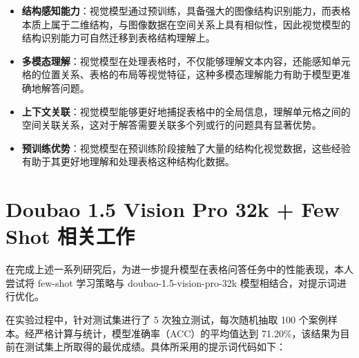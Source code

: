 \documentclass[12pt,a4paper]{ctexart}
\begin{document}
\begin{itemize}
  \item \textbf{结构感知能力}：视觉模型通过预训练，具备强大的图像结构识别能力，而表格本质上属于二维结构，与图像数据在空间关系上具有相似性，因此视觉模型的结构识别能力可自然迁移到表格结构理解上。
  \item \textbf{多模态理解}：视觉模型在处理表格时，不仅能够理解文本内容，还能感知单元格的位置关系、表格的布局等视觉特征，这种多模态理解能力有助于模型更准确地解答问题。
  \item \textbf{上下文关联}：视觉模型能够更好地捕捉表格中的全局信息，理解单元格之间的空间关联关系，这对于解答需要关联多个列或行的问题具有显著优势。
  \item \textbf{预训练优势}：视觉模型在预训练阶段接触了大量的结构化视觉数据，这些经验有助于其更好地理解和处理表格这种结构化数据。
\end{itemize}

\section{Doubao 1.5 Vision Pro 32k + Few Shot 相关工作}
在完成上述一系列研究后，为进一步提升模型在表格问答任务中的性能表现，本人尝试将 few-shot 学习策略与 doubao-1.5-vision-pro-32k 模型相结合，对提示词进行优化。

在实验过程中，针对测试集进行了 5 次独立测试，每次随机抽取 100 个案例样本。经严格计算与统计，模型准确率（ACC）的平均值达到 71.20\%，该结果为目前在测试集上所取得的最优成绩。具体所采用的提示词代码如下：
\end{document}
